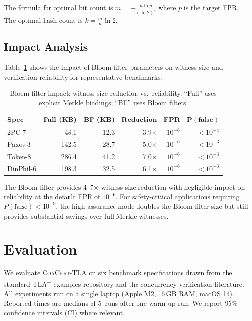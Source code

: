 \documentclass[11pt]{article}
\newcommand{\CoaCert}{\textsc{CoaCert-TLA}}
\newcommand{\TLAplus}{TLA\textsuperscript{+}}
\begin{document}
The formula for optimal bit count is $m = -\frac{n \ln p}{(\ln 2)^2}$
where $p$ is the target FPR.
The optimal hash count is $k = \frac{m}{n} \ln 2$.

\subsection{Impact Analysis}

Table~\ref{tab:bloom-impact} shows the impact of Bloom filter parameters
on witness size and verification reliability for representative benchmarks.

\begin{table}[t]
\centering
\caption{Bloom filter impact: witness size reduction vs.\ reliability.
  ``Full'' uses explicit Merkle bindings; ``BF'' uses Bloom filters.}
\label{tab:bloom-impact}
\small
\begin{tabular}{@{}lrrrrr@{}}
\toprule
\textbf{Spec} & \textbf{Full (KB)} & \textbf{BF (KB)} &
  \textbf{Reduction} & \textbf{FPR} & $\boldsymbol{P(\text{false})}$ \\
\midrule
2PC-7     &   48.1 &  12.3 & 3.9$\times$ & $10^{-6}$ & $< 10^{-4}$ \\
Paxos-3   &  142.5 &  28.7 & 5.0$\times$ & $10^{-6}$ & $< 10^{-3}$ \\
Token-8   &  286.4 &  41.2 & 7.0$\times$ & $10^{-6}$ & $< 10^{-3}$ \\
DinPhil-6 &  198.3 &  32.5 & 6.1$\times$ & $10^{-6}$ & $< 10^{-3}$ \\
\bottomrule
\end{tabular}
\end{table}

The Bloom filter provides 4--7$\times$ witness size reduction with
negligible impact on reliability at the default FPR of $10^{-6}$.
For safety-critical applications requiring $P(\text{false}) < 10^{-9}$,
the high-assurance mode doubles the Bloom filter size but still provides
substantial savings over full Merkle witnesses.


\section{Evaluation}
\label{sec:evaluation}

We evaluate \CoaCert{} on six benchmark specifications drawn from the
standard \TLAplus{} examples repository and the concurrency verification
literature.
All experiments run on a single laptop (Apple M2, 16\,GB RAM, macOS 14).
Reported times are medians of 5~runs after one warm-up run.
We report 95\% confidence intervals (CI) where relevant.
\end{document}
